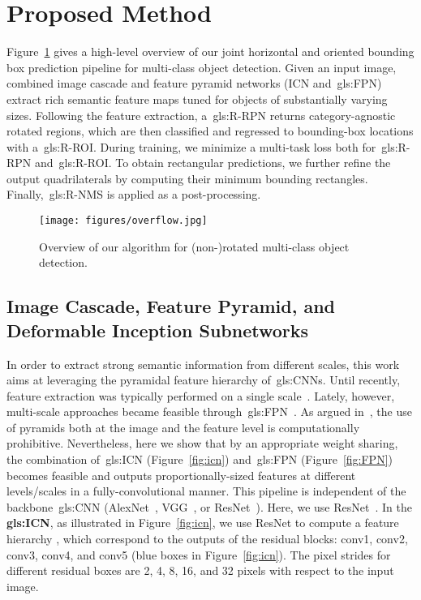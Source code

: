 \documentclass[runningheads]{llncs}
\newcommand{\overviewfigure}{
	\begin{figure}[t]
		\centering
		\texttt{[image: figures/overflow.jpg]}
		\caption{Overview of our algorithm for (non-)rotated multi-class object detection.}
		\label{fig:overflow}
	\end{figure}
}
\begin{document}
	\section{Proposed Method}\label{sec:method}
	Figure~\ref{fig:overflow} gives a high-level overview of our joint horizontal and oriented bounding box prediction pipeline for multi-class object detection. Given an input image, combined image cascade and feature pyramid networks (ICN and~\gls{gls:FPN}) extract rich semantic feature maps tuned for objects of substantially varying sizes.
    Following the feature extraction, a~\gls{gls:R-RPN} returns category-agnostic rotated regions, which are then classified and regressed to bounding-box locations with a~\gls{gls:R-ROI}.
    During training, we minimize a multi-task loss both for~\gls{gls:R-RPN} and~\gls{gls:R-ROI}. 
    To obtain rectangular predictions, we further refine the output quadrilaterals by computing their minimum bounding rectangles. 
Finally,~\gls{gls:R-NMS} is applied as a post-processing.
\overviewfigure
	\subsection{Image Cascade, Feature Pyramid, and Deformable Inception Subnetworks}\label{2-1}
	In order to extract strong semantic information from different scales, this work aims at leveraging the pyramidal feature hierarchy of~\glspl{gls:CNN}.
    Until recently, feature extraction was typically performed on a single scale~\cite{fasterrcnnNIPS2015}. Lately, however, multi-scale approaches became feasible through~\gls{gls:FPN}~\cite{fpn}.
	As argued in~\cite{fpn}, the use of pyramids both at the image and the feature level is computationally prohibitive. Nevertheless, here we show that by an appropriate weight sharing, the combination of~\gls{gls:ICN} (Figure~\ref{fig:icn}) and~\gls{gls:FPN} (Figure~\ref{fig:FPN}) becomes feasible and outputs proportionally-sized features at different levels/scales in a fully-convolutional manner.
	This pipeline is independent of the backbone~\gls{gls:CNN} (\eg AlexNet~\cite{alexnet}, VGG~\cite{Simonyan2015VeryRecognition}, or ResNet~\cite{resnetHe15}). Here, we use ResNet~\cite{resnetHe15}. 
In the \textbf{\gls{gls:ICN}}, as illustrated in Figure~\ref{fig:icn}, we use ResNet to compute a feature hierarchy ,  which correspond to the outputs of the residual blocks: conv1, conv2, conv3, conv4, and conv5 (blue boxes in Figure~\ref{fig:icn}). The pixel strides for different residual boxes are 2, 4, 8, 16, and 32 pixels with respect to the input image.
\end{document}
